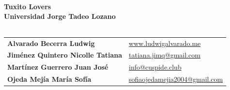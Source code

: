 \thispagestyle{empty} %
\vspace*{\fill}
\sffamily

\Large{
\noindent
\textbf{Tuxito Lovers}\\
\textbf{Universidad Jorge Tadeo Lozano}\\\\
}

\small
\noindent
\normalsize
\begin{tabular}{@{} l l @{}}
\textbf{Alvarado Becerra Ludwig} & \href{https://www.ludwigalvarado.me}{www.ludwigalvarado.me} \\
\textbf{Jiménez Quintero Nicolle Tatiana} & \href{mailto:tatiana.jimq@gmail.com}{tatiana.jimq@gmail.com} \\
\textbf{Martínez Guerrero Juan José} & \href{mailto:info@cuspide.club}{info@cuspide.club} \\
\textbf{Ojeda Mejía María Sofía} & \href{mailto:sofiaojedamejia2004@gmail.com}{sofiaojedamejia2004@gmail.com} \\
\end{tabular}
\vspace*{2.5cm}
